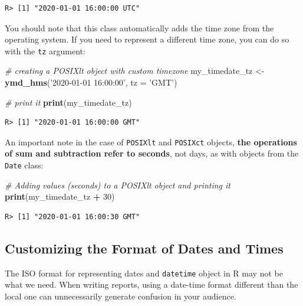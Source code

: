 \documentclass[
  12pt,
]{book}
\newenvironment{Shaded}{\begin{snugshade}}{\end{snugshade}}
\newcommand{\CommentTok}[1]{\textcolor[rgb]{0.37,0.37,0.37}{\textit{#1}}}
\newcommand{\DataTypeTok}[1]{\textcolor[rgb]{0.27,0.27,0.27}{#1}}
\newcommand{\DecValTok}[1]{\textcolor[rgb]{0.06,0.06,0.06}{#1}}
\newcommand{\KeywordTok}[1]{\textcolor[rgb]{0.27,0.27,0.27}{\textbf{#1}}}
\newcommand{\NormalTok}[1]{#1}
\newcommand{\OperatorTok}[1]{\textcolor[rgb]{0.43,0.43,0.43}{\textbf{#1}}}
\newcommand{\StringTok}[1]{\textcolor[rgb]{0.5,0.5,0.5}{#1}}
\begin{document}
\begin{verbatim}
R> [1] "2020-01-01 16:00:00 UTC"
\end{verbatim}

You should note that this class automatically adds the time zone from the operating system. If you need to represent a different time zone, you can do so with the \texttt{tz} argument:

\begin{Shaded}
\begin{Highlighting}[]
\CommentTok{# creating a POSIXlt object with custom timezone}
\NormalTok{my_timedate_tz <-}\StringTok{ }\KeywordTok{ymd_hms}\NormalTok{(}\StringTok{'2020-01-01 16:00:00'}\NormalTok{,}
                          \DataTypeTok{tz =} \StringTok{'GMT'}\NormalTok{)}

\CommentTok{# print it}
\KeywordTok{print}\NormalTok{(my_timedate_tz)}
\end{Highlighting}
\end{Shaded}

\begin{verbatim}
R> [1] "2020-01-01 16:00:00 GMT"
\end{verbatim}

An important note in the case of \texttt{POSIXlt} and \texttt{POSIXct} objects, \textbf{the operations of sum and subtraction refer to seconds}, not days, as with objects from the \texttt{Date} class:

\begin{Shaded}
\begin{Highlighting}[]
\CommentTok{# Adding values (seconds) to a POSIXlt object and printing it}
\KeywordTok{print}\NormalTok{(my_timedate_tz }\OperatorTok{+}\StringTok{ }\DecValTok{30}\NormalTok{)}
\end{Highlighting}
\end{Shaded}

\begin{verbatim}
R> [1] "2020-01-01 16:00:30 GMT"
\end{verbatim}

\hypertarget{customizing-the-format-of-dates-and-times}{%
\subsection{Customizing the Format of Dates and Times}\label{customizing-the-format-of-dates-and-times}}

The ISO format for representing dates and \texttt{datetime} object in R may not be what we need. When writing reports, using a date-time format different than the local one can unnecessarily generate confusion in your audience.
\end{document}
